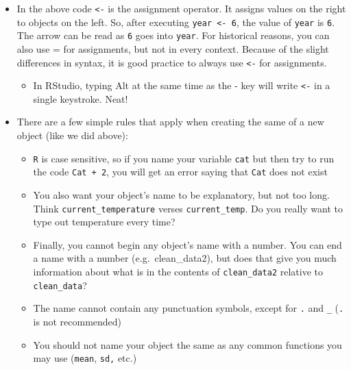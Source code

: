 \documentclass[]{article}
\providecommand{\tightlist}{%
  \setlength{\itemsep}{0pt}\setlength{\parskip}{0pt}}
\begin{document}
\begin{itemize}
\item
  In the above code \texttt{\textless{}-} is the assignment operator. It
  assigns values on the right to objects on the left. So, after
  executing \texttt{year\ \textless{}-\ 6}, the value of \texttt{year}
  is \texttt{6}. The arrow can be read as \texttt{6} goes into
  \texttt{year}. For historical reasons, you can also use = for
  assignments, but not in every context. Because of the slight
  differences in syntax, it is good practice to always use
  \texttt{\textless{}-} for assignments.

  \begin{itemize}
  \tightlist
  \item
    In RStudio, typing Alt at the same time as the - key will write
    \texttt{\textless{}-} in a single keystroke. Neat!
  \end{itemize}
\item
  There are a few simple rules that apply when creating the same of a
  new object (like we did above):

  \begin{itemize}
  \tightlist
  \item
    \texttt{R} is case sensitive, so if you name your variable
    \texttt{cat} but then try to run the code \texttt{Cat\ +\ 2}, you
    will get an error saying that \texttt{Cat} does not exist\\
  \item
    You also want your object's name to be explanatory, but not too
    long. Think \texttt{current\_temperature} verses
    \texttt{current\_temp}. Do you really want to type out temperature
    every time?\\
  \item
    Finally, you cannot begin any object's name with a number. You can
    end a name with a number (e.g.~clean\_data2), but does that give you
    much information about what is in the contents of
    \texttt{clean\_data2} relative to \texttt{clean\_data}?\\
  \item
    The name cannot contain any punctuation symbols, except for
    \texttt{.} and \texttt{\_} (\texttt{.} is not recommended)\\
  \item
    You should not name your object the same as any common functions you
    may use (\texttt{mean}, \texttt{sd,} etc.)
  \end{itemize}
\end{itemize}
\end{document}
